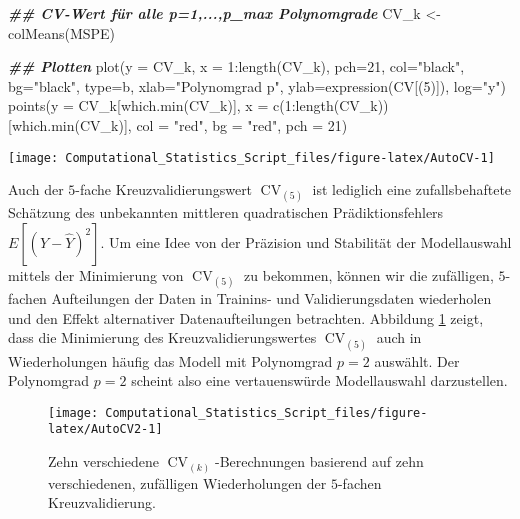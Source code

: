 \documentclass[
  ngerman,
]{book}
\newenvironment{Shaded}{\begin{snugshade}}{\end{snugshade}}
\newcommand{\AttributeTok}[1]{\textcolor[rgb]{0.77,0.63,0.00}{#1}}
\newcommand{\DecValTok}[1]{\textcolor[rgb]{0.00,0.00,0.81}{#1}}
\newcommand{\DocumentationTok}[1]{\textcolor[rgb]{0.56,0.35,0.01}{\textbf{\textit{#1}}}}
\newcommand{\FunctionTok}[1]{\textcolor[rgb]{0.00,0.00,0.00}{#1}}
\newcommand{\NormalTok}[1]{#1}
\newcommand{\OtherTok}[1]{\textcolor[rgb]{0.56,0.35,0.01}{#1}}
\newcommand{\SpecialCharTok}[1]{\textcolor[rgb]{0.00,0.00,0.00}{#1}}
\newcommand{\StringTok}[1]{\textcolor[rgb]{0.31,0.60,0.02}{#1}}
\begin{document}
\begin{Shaded}
\begin{Highlighting}[]
\DocumentationTok{\#\# CV{-}Wert für alle p=1,...,p\_max Polynomgrade }
\NormalTok{CV\_k }\OtherTok{\textless{}{-}} \FunctionTok{colMeans}\NormalTok{(MSPE)}

\DocumentationTok{\#\# Plotten}
\FunctionTok{plot}\NormalTok{(}\AttributeTok{y =}\NormalTok{ CV\_k, }\AttributeTok{x =} \DecValTok{1}\SpecialCharTok{:}\FunctionTok{length}\NormalTok{(CV\_k), }\AttributeTok{pch=}\DecValTok{21}\NormalTok{, }\AttributeTok{col=}\StringTok{"black"}\NormalTok{, }\AttributeTok{bg=}\StringTok{"black"}\NormalTok{, }
     \AttributeTok{type=}\StringTok{\textquotesingle{}b\textquotesingle{}}\NormalTok{, }\AttributeTok{xlab=}\StringTok{"Polynomgrad p"}\NormalTok{, }\AttributeTok{ylab=}\FunctionTok{expression}\NormalTok{(CV[(}\DecValTok{5}\NormalTok{)]), }\AttributeTok{log=}\StringTok{"y"}\NormalTok{)}
\FunctionTok{points}\NormalTok{(}\AttributeTok{y =}\NormalTok{ CV\_k[}\FunctionTok{which.min}\NormalTok{(CV\_k)],}
       \AttributeTok{x =} \FunctionTok{c}\NormalTok{(}\DecValTok{1}\SpecialCharTok{:}\FunctionTok{length}\NormalTok{(CV\_k))[}\FunctionTok{which.min}\NormalTok{(CV\_k)],}
       \AttributeTok{col =} \StringTok{"red"}\NormalTok{, }\AttributeTok{bg =} \StringTok{"red"}\NormalTok{, }\AttributeTok{pch =} \DecValTok{21}\NormalTok{)}
\end{Highlighting}
\end{Shaded}

\begin{center}\texttt{[image: Computational\_Statistics\_Script\_files/figure-latex/AutoCV-1]} \end{center}

Auch der \(5\)-fache Kreuzvalidierungswert \(\operatorname{CV}_{(5)}\) ist lediglich eine zufallsbehaftete Schätzung des unbekannten mittleren quadratischen Prädiktionsfehlers \(E[(Y-\hat{Y})^2]\). Um eine Idee von der Präzision und Stabilität der Modellauswahl mittels der Minimierung von \(\operatorname{CV}_{(5)}\) zu bekommen, können wir die zufälligen, \(5\)-fachen Aufteilungen der Daten in Trainins- und Validierungsdaten wiederholen und den Effekt alternativer Datenaufteilungen betrachten. Abbildung \ref{fig:AutoCV2} zeigt, dass die Minimierung des Kreuzvalidierungswertes \(\operatorname{CV}_{(5)}\) auch in Wiederholungen häufig das Modell mit Polynomgrad \(p=2\) auswählt. Der Polynomgrad \(p=2\) scheint also eine vertauenswürde Modellauswahl darzustellen.\\

\begin{figure}[h]

{\centering \texttt{[image: Computational\_Statistics\_Script\_files/figure-latex/AutoCV2-1]} 

}

\caption{Zehn verschiedene $\operatorname{CV}_{(k)}$-Berechnungen basierend auf zehn verschiedenen, zufälligen Wiederholungen der $5$-fachen Kreuzvalidierung.}\label{fig:AutoCV2}
\end{figure}
\end{document}
